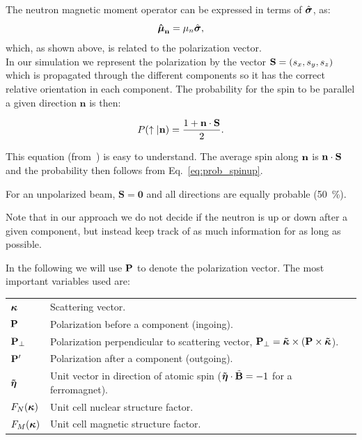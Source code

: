 The neutron magnetic moment operator can be expressed in terms of $\hat{\mbox{\boldmath $\sigma$}}$,
as:
\begin{equation}
  \label{eq:magnetic}
  \mathbf{\hat{\mbox{\boldmath $\mu$}}_n} = \mu_n \hat{\mbox{\boldmath $\sigma$}},
\end{equation}
which, as shown above, is related to the polarization vector.  \\

In our simulation we represent the polarization by the vector $\mathbf{S} = (s_x,
s_y, s_z)$ which is propagated through the different components so it has the
correct relative orientation in each component. The probability for the spin
to be parallel a given direction $\mathbf{n}$ is then:

 \begin{equation}
   \label{eq:probmcstas}
   P(\uparrow|\mathbf{n}) = \frac{1+\mathbf{n} \cdot \mathbf{S}}{2}.
 \end{equation}

This equation (from~\cite{pol_seeger}) is easy to understand. The
average spin along $\mathbf{n}$ is $\mathbf{n} \cdot \mathbf{S}$ and the probability then
follows from Eq.~\ref{eq:prob_spinup}.

For an unpolarized beam, $\mathbf{S} = \mathbf{0}$ and all directions
are equally probable (50~\%).

Note that in our approach we do not decide if the neutron is up or down after
a given component, but instead keep track of as much information for as long
as possible.

In the following we will use $\mathbf{P}$ to denote the polarization
vector. The most important variables used are:

\begin{tabular}{ll}
    
  $\mathbf{\mbox{\boldmath $\kappa$}}$  & Scattering vector. \\
  $\mathbf{P}$  & Polarization before a component (ingoing). \\ 
  $\mathbf{P}_\perp$  & Polarization perpendicular to scattering vector, 
  $\mathbf{P}_\perp = \mathbf{\tilde{\mathbf{\mbox{\boldmath $\kappa$}}}} \times (\mathbf{P} \times \mathbf{\tilde{\mathbf{\mbox{\boldmath $\kappa$}}}}$). \\ 
  $\mathbf{P}'$ & Polarization after a component (outgoing). \\
  $\mathbf{\tilde{\mbox{\boldmath $\eta$}}}$ & Unit vector in direction of atomic spin ($\mathbf{\tilde{\mbox{\boldmath $\eta$}}} \cdot \tilde{\mathbf{B}} = -1$ for a ferromagnet). \\
  $F_N(\mathbf{\mbox{\boldmath $\kappa$}})$ & Unit cell nuclear structure factor. \\
  $F_M(\mathbf{\mbox{\boldmath $\kappa$}})$ & Unit cell magnetic structure factor. \\
\end{tabular}
\\

